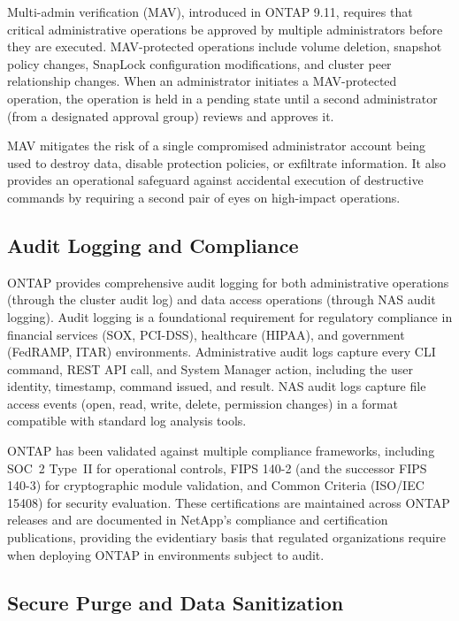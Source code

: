 \begin{securitybox}
Multi-admin verification (MAV), introduced in ONTAP 9.11, requires that critical administrative operations be approved by multiple administrators before they are executed. MAV-protected operations include volume deletion, snapshot policy changes, SnapLock configuration modifications, and cluster peer relationship changes. When an administrator initiates a MAV-protected operation, the operation is held in a pending state until a second administrator (from a designated approval group) reviews and approves it.

MAV mitigates the risk of a single compromised administrator account being used to destroy data, disable protection policies, or exfiltrate information. It also provides an operational safeguard against accidental execution of destructive commands by requiring a second pair of eyes on high-impact operations.

\subsection*{Audit Logging and Compliance}

ONTAP provides comprehensive audit logging for both administrative operations (through the cluster audit log) and data access operations (through NAS audit logging). Audit logging is a foundational requirement for regulatory compliance in financial services (SOX, PCI-DSS), healthcare (HIPAA), and government (FedRAMP, ITAR) environments. Administrative audit logs capture every CLI command, REST API call, and System Manager action, including the user identity, timestamp, command issued, and result. NAS audit logs capture file access events (open, read, write, delete, permission changes) in a format compatible with standard log analysis tools.

ONTAP has been validated against multiple compliance frameworks, including SOC~2 Type~II for operational controls, FIPS 140-2 (and the successor FIPS 140-3) for cryptographic module validation, and Common Criteria (ISO/IEC 15408) for security evaluation. These certifications are maintained across ONTAP releases and are documented in NetApp's compliance and certification publications, providing the evidentiary basis that regulated organizations require when deploying ONTAP in environments subject to audit.

\subsection*{Secure Purge and Data Sanitization}


\end{securitybox}
